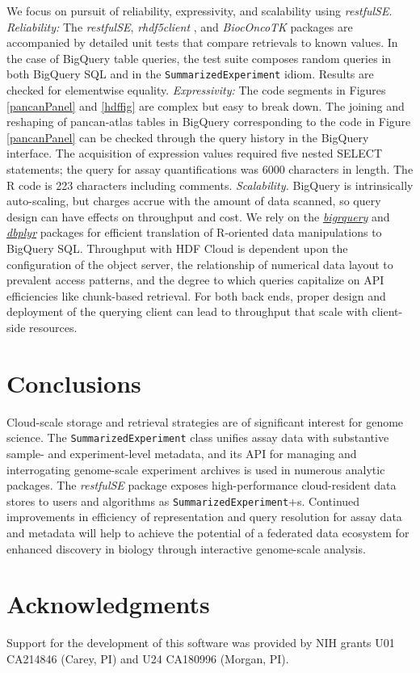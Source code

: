 \documentclass[applications]{gen-bioinformatics}
\newcommand{\Biocpackage}[1]{{\textit{#1}}}
\newcommand{\CRANpackage}[1]{{\emph{\href{https://cran.r-project.org/web/packages/#1/index.html}{#1}}}}
\newcommand{\CRANpackageFirst}[1]{{\emph{\href{https://cran.r-project.org/web/packages/#1/index.html}{#1}}}}
\newcommand{\Rclass}[1]{{\texttt{#1}}}
\begin{document}
We focus on pursuit of reliability,
expressivity, and scalability using \Biocpackage{restfulSE}.  
\textit{Reliability:} 
The \Biocpackage{restfulSE}, \Biocpackage{rhdf5client} \citep{rclient},
and \Biocpackage{BiocOncoTK} \citep{bionc} packages are accompanied by detailed unit
tests that compare retrievals to known values.  In the
case of BigQuery table queries, the test
suite composes random queries 
in both BigQuery SQL and in the \texttt{SummarizedExperiment} 
idiom.  Results
are checked for elementwise equality.  \textit{Expressivity:} The code
segments in Figures \ref{pancanPanel} and \ref{hdffig} are
complex but easy to break down.  The joining and
reshaping of pancan-atlas tables in BigQuery corresponding
to the code in Figure \ref{pancanPanel}
can be checked through the query history in the BigQuery
interface.  The acquisition of expression values required
five nested SELECT statements; the query for assay quantifications
was 6000 characters in length.
The R code is 223 characters including comments.
\textit{Scalability.}  BigQuery is intrinsically auto-scaling,
but charges accrue with the amount of data scanned, 
so query design can have effects on throughput
and cost.  We rely on the \CRANpackage{bigrquery} \citep{bigr} and \CRANpackageFirst{dbplyr} \citep{dbp} packages for
efficient translation of R-oriented data manipulations to 
BigQuery SQL.  Throughput with HDF Cloud 
is dependent upon the configuration of the object server,
the relationship of numerical data layout to prevalent access
patterns, and the degree to which queries capitalize on
API efficiencies like chunk-based retrieval.  For both
back ends, proper design and deployment of the querying client can
lead to throughput that scale with client-side resources.

\section*{Conclusions}

Cloud-scale storage and retrieval strategies are of significant
interest for genome science.  
The \Rclass{SummarizedExperiment} class
unifies assay data with substantive sample- and experiment-level
metadata, and its API for managing and interrogating
genome-scale experiment archives is used in numerous
analytic packages.  
The \Biocpackage{restfulSE} package exposes high-performance
cloud-resident data stores to users and
algorithms as \texttt{SummarizedExperiment}+s.  Continued improvements
in efficiency of
representation and query resolution for assay data and metadata
will help to achieve the potential of a federated data ecosystem for
enhanced discovery in biology through interactive genome-scale analysis.



\section*{Acknowledgments}
Support for the development of this software was provided by NIH grants
U01 CA214846 (Carey, PI) and U24 CA180996 (Morgan, PI).


\end{document}
